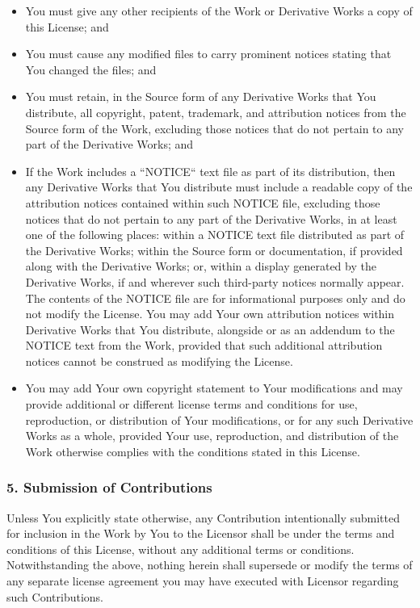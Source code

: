 \documentclass[a4paper, 11pt, twoside]{article}
\begin{document}
\begin{itemize}
\item You must give any other recipients of the Work or Derivative Works a copy of this License; and
\item You must cause any modified files to carry prominent notices stating that You changed the files; and
\item You must retain, in the Source form of any Derivative Works that You distribute, all copyright, patent, trademark, and attribution notices from the Source form of the Work, excluding those notices that do not pertain to any part of the Derivative Works; and
\item If the Work includes a “NOTICE“ text file as part of its distribution, then any Derivative Works that You distribute must include a readable copy of the attribution notices contained within such NOTICE file, excluding those notices that do not pertain to any part of the Derivative Works, in at least one of the following places: within a NOTICE text file distributed as part of the Derivative Works; within the Source form or documentation, if provided along with the Derivative Works; or, within a display generated by the Derivative Works, if and wherever such third-party notices normally appear. The contents of the NOTICE file are for informational purposes only and do not modify the License. You may add Your own attribution notices within Derivative Works that You distribute, alongside or as an addendum to the NOTICE text from the Work, provided that such additional attribution notices cannot be construed as modifying the License.
\item You may add Your own copyright statement to Your modifications and may provide additional or different license terms and conditions for use, reproduction, or distribution of Your modifications, or for any such Derivative Works as a whole, provided Your use, reproduction, and distribution of the Work otherwise complies with the conditions stated in this License.
\end{itemize}

\subsubsection{5. Submission of Contributions}

Unless You explicitly state otherwise, any Contribution intentionally submitted for inclusion in the Work by You to the Licensor shall be under the terms and conditions of this License, without any additional terms or conditions. Notwithstanding the above, nothing herein shall supersede or modify the terms of any separate license agreement you may have executed with Licensor regarding such Contributions.
\end{document}
